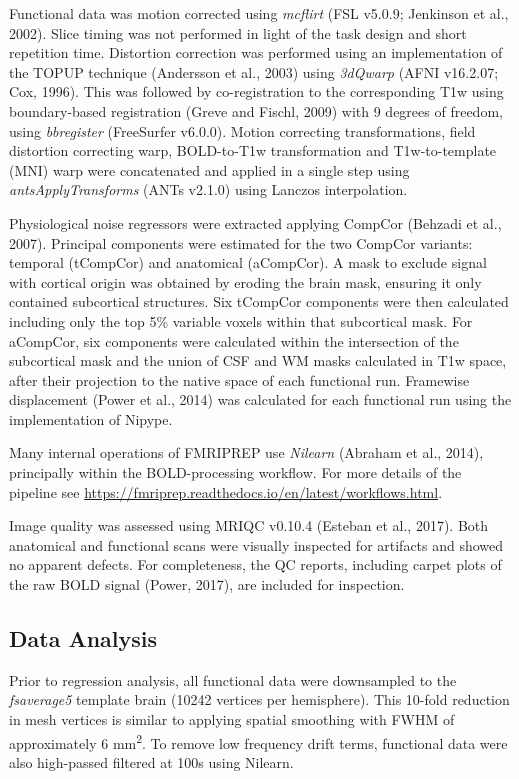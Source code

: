 \documentclass[9pt]{NEU502b-fmri}
\begin{document}
Functional data was motion corrected using \textit{mcflirt} (FSL v5.0.9; Jenkinson et al., 2002). Slice timing was not performed in light of the task design and short repetition time. Distortion correction was performed using an implementation of the TOPUP technique (Andersson et al., 2003) using \textit{3dQwarp} (AFNI v16.2.07; Cox, 1996). This was followed by co-registration to the corresponding T1w using boundary-based registration (Greve and Fischl, 2009) with 9 degrees of freedom, using \textit{bbregister} (FreeSurfer v6.0.0). Motion correcting transformations, field distortion correcting warp, BOLD-to-T1w transformation and T1w-to-template (MNI) warp were concatenated and applied in a single step using \textit{antsApplyTransforms} (ANTs v2.1.0) using Lanczos interpolation.

Physiological noise regressors were extracted applying CompCor (Behzadi et al., 2007). Principal components were estimated for the two CompCor variants: temporal (tCompCor) and anatomical (aCompCor). A mask to exclude signal with cortical origin was obtained by eroding the brain mask, ensuring it only contained subcortical structures. Six tCompCor components were then calculated including only the top 5\% variable voxels within that subcortical mask. For aCompCor, six components were calculated within the intersection of the subcortical mask and the union of CSF and WM masks calculated in T1w space, after their projection to the native space of each functional run. Framewise displacement (Power et al., 2014) was calculated for each functional run using the implementation of Nipype.

Many internal operations of FMRIPREP use \textit{Nilearn} (Abraham et al., 2014), principally within the BOLD-processing workflow. For more details of the pipeline see \href{https://fmriprep.readthedocs.io/en/latest/workflows.html}{https://fmriprep.readthedocs.io/en/latest/workflows.html}.

Image quality was assessed using MRIQC v0.10.4 (Esteban et al., 2017). Both anatomical and functional scans were visually inspected for artifacts and showed no apparent defects. For completeness, the QC reports, including carpet plots of the raw BOLD signal (Power, 2017), are included for inspection.

\subsection{Data Analysis}
Prior to regression analysis, all functional data were downsampled to the \textit{fsaverage5} template brain (10242 vertices per hemisphere). This 10-fold reduction in mesh vertices is similar to applying spatial smoothing with FWHM of approximately 6 mm\textsuperscript{2}. To remove  low frequency drift terms, functional data were also high-passed filtered at 100s using Nilearn.
\end{document}
